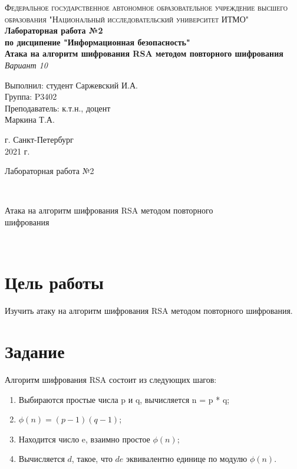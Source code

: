 \documentclass[12pt, a4paper]{article}
\begin{document}
\begin{titlepage}
\begin{center}

\textsc{Федеральное государственное автономное образовательное учреждение высшего\\
образования "Национальный исследовательский университет ИТМО"}
\vfill
\textbf{Лабораторная работа №2\\[4mm]
по дисципение "Информационная безопасность"\\[4mm]
Атака на алгоритм шифрования RSA методом повторного шифрования\\[4mm]
}
\textit{Вариант 10\\[20mm]}
\begin{flushright}
Выполнил: студент Саржевский И.А.
\\[2mm]Группа: P3402\\[4mm]
Преподаватель: к.т.н., доцент\\
Маркина Т.А.
\end{flushright}
\vfill
г. Санкт-Петербург\\[2mm]
2021 г.

\end{center}
\end{titlepage}

\begin{huge}Лабораторная работа №2\end{huge}\\[4mm]
\begin{Large}Атака на алгоритм шифрования RSA методом повторного\\шифрования\end{Large}\\

\section*{Цель работы}

Изучить атаку на алгоритм шифрования RSA методом повторного шифрования.

\section*{Задание}

Алгоритм шифрования RSA состоит из следующих шагов:

\begin{enumerate}
  \item Выбираются простые числа p и q, вычисляется n = p * q;
  \item $\phi(n) = (p - 1)(q - 1)$;
  \item Находится число e, взаимно простое $\phi(n)$;
  \item Вычисляется $d$, такое, что $de$ эквивалентно единице по модулю $\phi(n)$.
\end{enumerate}
\end{document}
